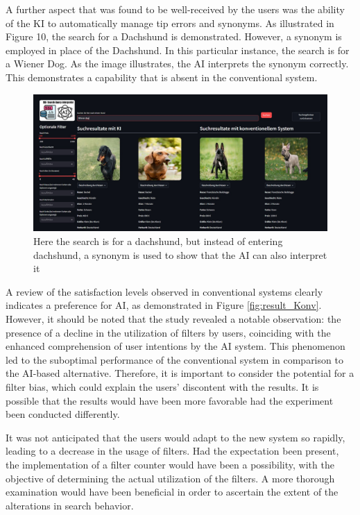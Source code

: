 \documentclass[../../submission.tex]{subfiles}
\begin{document}
A further aspect that was found to be well-received by the users was the ability of the KI to automatically 
manage tip errors and synonyms. As illustrated in Figure 10, the search for a Dachshund 
is demonstrated. However, a synonym is employed in place of the Dachshund. In this 
particular instance, the search is for a Wiener Dog. As the image illustrates, the AI 
interprets the synonym correctly. This demonstrates a capability that is absent in the 
conventional system. 

\begin{figure}[h]
    \includegraphics[width=\textwidth]{images/wiener_dog}
    \caption{Here the search is for a dachshund, but instead of entering dachshund, a synonym is used to show that the AI can also interpret it}
    \Description{}
    \label{fig:wiener_dog}
 \end{figure}



A review of the satisfaction levels observed in conventional systems clearly 
indicates a preference for AI, as demonstrated in Figure \ref{fig:result_Konv}. However, it should 
be noted that the study revealed a notable observation: the presence of a decline 
in the utilization of filters by users, coinciding with the enhanced comprehension 
of user intentions by the AI system. This phenomenon led to the suboptimal performance
 of the conventional system in comparison to the AI-based alternative. 
 Therefore, it is important to consider the potential for a filter bias, 
 which could explain the users' discontent with the results.
 It is possible that the results would have been more favorable had the experiment 
 been conducted differently.


 It was not anticipated that the users would adapt to the new 
 system so rapidly, leading to a decrease in the usage of filters.
 Had the expectation been present, the implementation of a filter counter would 
 have been a possibility, with the objective of determining the actual utilization of the filters.
 A more thorough examination would have been beneficial in order to ascertain the extent of the alterations in search behavior.
\end{document}
